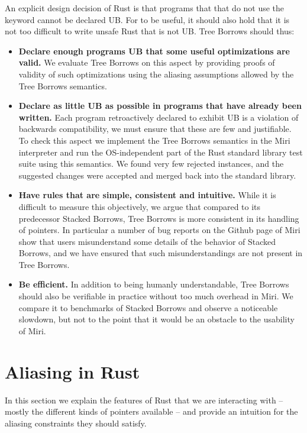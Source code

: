 \documentclass[a4paper,11pt]{article}
\theoremstyle{plain}
\theoremstyle{definition}
\theoremstyle{remark}
\newcommand{\tcode}[1]{\rstinline{#1}}
\begin{document}
An explicit design decision of Rust is that programs that that do not use the
\tcode{unsafe} keyword cannot be declared UB. For \tcode{unsafe} to be useful,
it should also hold that it is not too difficult to write unsafe Rust that is not
UB. Tree Borrows should thus:
\begin{itemize}
    \item \textbf{Declare enough programs UB that some useful optimizations are valid.}
        We evaluate Tree Borrows on this aspect by providing proofs of validity of such
        optimizations using the aliasing assumptions allowed by the Tree Borrows semantics.
    \item \textbf{Declare as little UB as possible in programs that have already been written.}
        Each program retroactively declared to exhibit UB is a violation of backwards compatibility,
        we must ensure that these are few and justifiable.
        To check this aspect we implement the Tree Borrows semantics in the Miri
        interpreter and run the OS-independent part of the Rust standard library
        test suite using this semantics. We found very few rejected instances, and
        the suggested changes were accepted and merged back into the standard library.
    \item \textbf{Have rules that are simple, consistent and intuitive.}
        While it is difficult to measure this objectively, we argue that compared
        to its predecessor Stacked Borrows, Tree Borrows is more consistent in
        its handling of pointers. In particular a number of bug reports on the
        Github page of Miri show that users misunderstand some details of the
        behavior of Stacked Borrows, and we have ensured that such misunderstandings
        are not present in Tree Borrows.
    \item \textbf{Be efficient.} In addition to being humanly understandable, Tree Borrows
        should also be verifiable in practice without too much overhead in Miri.
        We compare it to benchmarks of Stacked Borrows and observe a noticeable slowdown,
        but not to the point that it would be an obstacle to the usability of Miri.
\end{itemize}

\section{Aliasing in Rust}

In this section we explain the features of Rust that we are interacting with --
mostly the different kinds of pointers available -- and provide an intuition
for the aliasing constraints they should satisfy.
\end{document}
